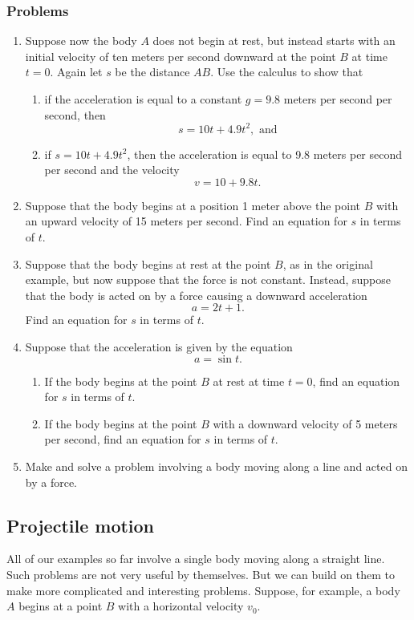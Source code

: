 \documentclass[polutonikogreek,english,twoside,openright]{article}
\begin{document}
\subsubsection*{Problems}
\begin{enumerate}
\item Suppose now the body $A$ does not begin at rest, but instead
  starts with an initial velocity of ten meters per second downward at
  the point $B$ at time $t =0$.  Again let $s$ be the distance $AB$.
  Use the calculus to show that
  \begin{enumerate}
  \item if the acceleration is equal to a constant $g = 9.8$ meters
    per second per second, then
$$s = 10t + 4.9t^2,\mbox{ and}$$
\item if $s = 10t + 4.9t^2$, then the acceleration is equal to 9.8
  meters per second per second and the velocity
$$v = 10 + 9.8t.$$
\end{enumerate}
\item Suppose that the body begins at a position 1 meter above the
  point $B$ with an upward velocity of 15 meters per second.  Find an
  equation for $s$ in terms of $t$.
\item Suppose that the body begins at rest at the point $B$, as in the
  original example, but now suppose that the force is not constant.
  Instead, suppose that the body is acted on by a force causing a
  downward acceleration $$a = 2t + 1.$$ Find an equation for $s$ in
  terms of $t$.
\item Suppose that the acceleration is given by the equation
$$a = \sin t.$$ 
\begin{enumerate}
\item If the body begins at the point $B$ at rest at time $t=0$, find
  an equation for $s$ in terms of $t$.
\item If the body begins at the point $B$ with a downward velocity of
  5 meters per second, find an equation for $s$ in terms of $t$.
\end{enumerate}
\item Make and solve a problem involving a body moving along a line
  and acted on by a force.

\end{enumerate}

\subsection*{Projectile motion}

All of our examples so far involve a single body moving along a
straight line.  Such problems are not very useful by themselves.  But
we can build on them to make more complicated and interesting
problems.  Suppose, for example, a body $A$ begins at a point $B$ with
a horizontal velocity $v_0$.
\end{document}
